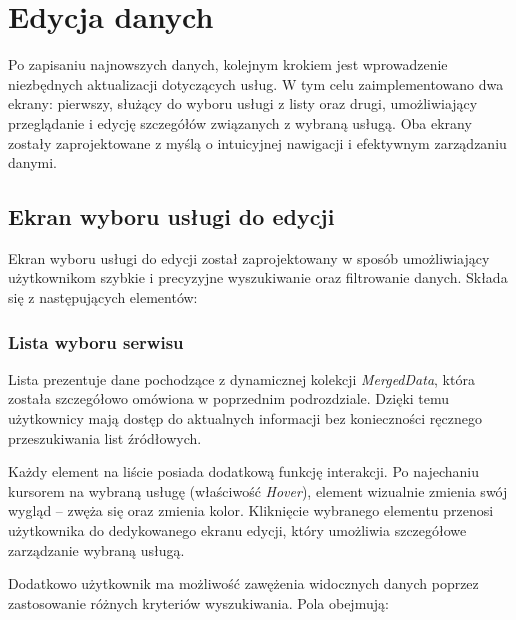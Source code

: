 \section{Edycja danych}

Po zapisaniu najnowszych danych, kolejnym krokiem jest wprowadzenie niezbędnych aktualizacji dotyczących usług. W tym celu zaimplementowano dwa ekrany: pierwszy, służący do wyboru usługi z listy oraz drugi, umożliwiający przeglądanie i edycję szczegółów związanych z wybraną usługą. Oba ekrany zostały zaprojektowane z myślą o intuicyjnej nawigacji i efektywnym zarządzaniu danymi.

\subsection{Ekran wyboru usługi do edycji}


Ekran wyboru usługi do edycji został zaprojektowany w sposób umożliwiający użytkownikom szybkie i precyzyjne wyszukiwanie oraz filtrowanie danych. Składa się z następujących elementów:

\subsubsection*{Lista wyboru serwisu}

Lista prezentuje dane pochodzące z dynamicznej kolekcji \emph{MergedData}, która została szczegółowo omówiona w poprzednim podrozdziale. Dzięki temu użytkownicy mają dostęp do aktualnych informacji bez konieczności ręcznego przeszukiwania list źródłowych.

Każdy element na liście posiada dodatkową funkcję interakcji. Po najechaniu kursorem na wybraną usługę (właściwość \emph{Hover}), element wizualnie zmienia swój wygląd -- zwęża się oraz zmienia kolor. Kliknięcie wybranego elementu przenosi użytkownika do dedykowanego ekranu edycji, który umożliwia szczegółowe zarządzanie wybraną usługą.

Dodatkowo użytkownik ma możliwość zawężenia widocznych danych poprzez zastosowanie różnych kryteriów wyszukiwania. Pola obejmują:

